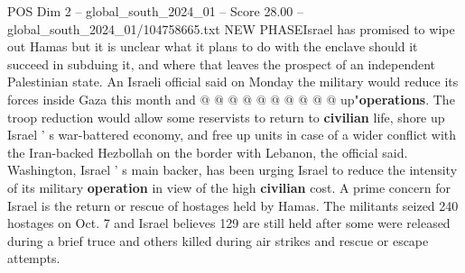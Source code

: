 \begin{textsample}{POS Dim 2 – global\_south\_2024\_01 – Score 28.00 – global\_south\_2024\_01/104758665.txt}
NEW PHASEIsrael has promised to wipe out Hamas but it is unclear what it plans to do with the enclave should it succeed in subduing it, and where that leaves the prospect of an independent Palestinian state.
An Israeli official said on Monday the military would reduce its forces inside Gaza this month and @ @ @ @ @ @ @ @ @ @ up"\textbf{operations}.
The troop reduction would allow some reservists to return to \textbf{civilian} life, shore up Israel ' s war-battered economy, and free up units in case of a wider conflict with the Iran-backed Hezbollah on the border with Lebanon, the official said.
Washington, Israel ' s main backer, has been urging Israel to reduce the intensity of its military \textbf{operation} in view of the high \textbf{civilian} cost.
A prime concern for Israel is the return or rescue of hostages held by Hamas.
The militants seized 240 hostages on Oct. 7 and Israel believes 129 are still held after some were released during a brief truce and others killed during air strikes and rescue or escape attempts.

\end{textsample}
